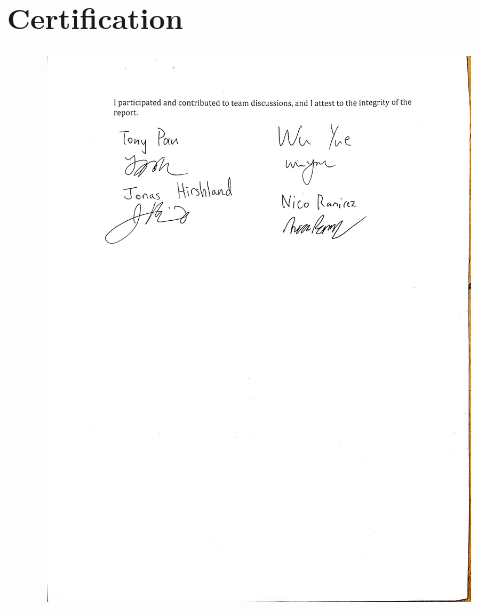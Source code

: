 \documentclass[conference]{IEEEtran}
\begin{document}
\section{Certification}
\begin{figure}
	\includegraphics[width=\linewidth]{certification.jpg}
\end{figure}






\clearpage
\begin{appendices}
\onecolumn
\end{appendices}
\end{document}
